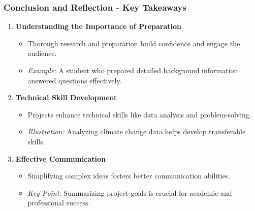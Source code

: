 \documentclass{beamer}
\begin{document}
\begin{frame}[fragile]
    \frametitle{Conclusion and Reflection - Key Takeaways}
    \begin{enumerate}
        \item \textbf{Understanding the Importance of Preparation}
        \begin{itemize}
            \item Thorough research and preparation build confidence and engage the audience.
            \item \textit{Example:} A student who prepared detailed background information answered questions effectively.
        \end{itemize}

        \item \textbf{Technical Skill Development}
        \begin{itemize}
            \item Projects enhance technical skills like data analysis and problem-solving.
            \item \textit{Illustration:} Analyzing climate change data helps develop transferable skills.
        \end{itemize}
        
        \item \textbf{Effective Communication}
        \begin{itemize}
            \item Simplifying complex ideas fosters better communication abilities.
            \item \textit{Key Point:} Summarizing project goals is crucial for academic and professional success.
        \end{itemize}
    \end{enumerate}
\end{frame}
\end{document}

